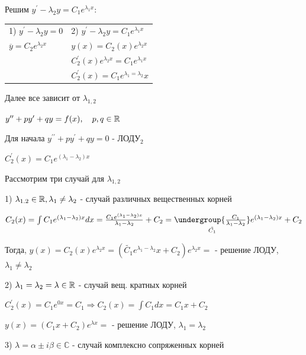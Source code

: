 \documentclass[12pt]{article}
\begin{document}
    Решим $y^\prime - \lambda_2 y = C_1 e^{\lambda_1 x}$:

    \begin{tabular}{p{5cm}p{10cm}}
        1) $y^\prime - \lambda_2 y = 0$      & 2) $y^\prime - \lambda_2 y = C_1 e^{\lambda_1 x}$     \\

        $\overline{y} = C_2 e^{\lambda_2 x}$ & $y(x) = C_2(x)e^{\lambda_2 x}$                        \\

        & $C_2^\prime(x) e^{\lambda_2 x} = C_1 e^{\lambda_1 x}$ \\

        & $C^\prime_2 (x) = C_1 e^{\lambda_1 = \lambda_2} x$
    \end{tabular}

    Далее все зависит от $\lambda_{1,2}$



    \Mem $y^{\prime\prime} + py^\prime + qy = f(x), \quad p, q \in \mathbb{R}$

    Для начала $y^{\prime\prime} + py^\prime + qy = 0$ - ЛОДУ$_2$

    $C^\prime_2 (x) = C_1 e^{(\lambda_1 - \lambda_2)x}$

    Рассмотрим три случай для $\lambda_{1,2}$

    1) $\lambda_{1.2} \in \mathbb{R}, \lambda_1 \neq \lambda_2$ - случай различных вещественных корней

    $C_2(x) = \int C_1 e^{(\lambda_1 - \lambda_2)x} dx = \frac{C_1 e^{(\lambda_1 - \lambda_2)x}}{\lambda_1 - \lambda_2} + C_2 =
    \underset{\tilde{C_1}}{\undergroup{\frac{C_1}{\lambda_1 - \lambda_2}}} e^{(\lambda_1 - \lambda_2)x} + C_2$

    Тогда, $y(x) = C_2(x) e^{\lambda_2 x} = (\tilde{C_1}e^{\lambda_1 - \lambda_2}x + C_2)e^{\lambda_2 x} = $ - решение ЛОДУ, $\lambda_1 \neq \lambda_2$

    2) $\lambda_1 = \lambda_2 = \lambda \in \mathbb{R}$ - случай вещ. кратных корней

    $C_2^\prime (x) = C_1 e^{0x} = C_1 \Longrightarrow C_2(x) = \int C_1 dx = C_1 x + C_2$

    $y(x) = (C_1 x + C_2)e^{\lambda x} = $ - решение ЛОДУ, $\lambda_1 = \lambda_2$

    3) $\lambda = \alpha \pm i \beta \in \mathbb{C}$ - случай комплексно сопряженных корней
\end{document}
